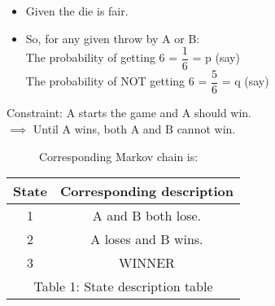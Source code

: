 \begin{itemize}
    \item Given the die is fair.
    \item So, for any given throw by A or B:\\
    The probability of getting 6 = $\dfrac{1}{6}$ = p (say)\\
    The probability of NOT getting 6 = $\dfrac{5}{6}$ = q (say)
\end{itemize}
Constraint: A starts the game and A should win.\\
$\implies$ Until A wins, both A and B cannot win.\\
\begin{figure}[!htb]
Corresponding Markov chain is:\\
\begin{center}
        \label{fig:Fig1}
\end{center}
\end{figure}
\begin{table}[!htb]
    \begin{center}
    \begin{tabular}{|c|c|}
        \hline
        State & Corresponding description \\
        \hline
        1 & A and B both lose.\\
        \hline
        2 & A loses and B wins.\\
        \hline
        3 & WINNER\\
        \hline
      \multicolumn{2}{c}{Table 1: State description table}
    \end{tabular}
    \end{center}
\end{table}
